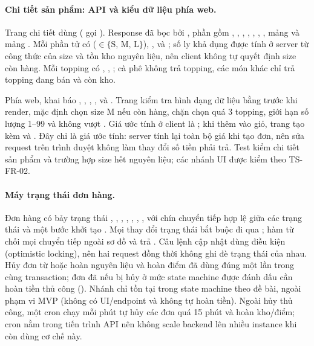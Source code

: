 \paragraph{Chi tiết sản phẩm: API và kiểu dữ liệu phía web.}
Trang chi tiết dùng  ( gọi
). Response đã bọc bởi , phần
 gồm , , , , ,
, , mảng  và mảng . Mỗi phần tử
 có  ($\in \{\text{S, M, L}\}$), ,
 và ; số ly khả dụng được tính ở server từ công thức của
size và tồn kho nguyên liệu, nên client không tự quyết định size còn hàng. Mỗi topping có
, , ; cà phê không trả topping, các món khác chỉ trả topping đang
bán và còn kho.

Phía web,  khai báo ,
, , ,  và
. Trang  kiểm tra hình dạng dữ
liệu bằng  trước khi render, mặc định chọn size M nếu còn hàng, chặn chọn quá
3 topping, giới hạn số lượng 1--99 và không vượt . Giá ước tính ở client là
; khi thêm vào giỏ, trang tạo  kèm
 và . Đây chỉ là giá ước tính: server tính lại toàn bộ giá
khi tạo đơn, nên sửa request trên trình duyệt không làm thay đổi số tiền phải trả. Test
 kiểm chi tiết sản phẩm và trường hợp size hết nguyên liệu; các nhánh UI
được kiểm theo TS-FR-02.

\paragraph{Máy trạng thái đơn hàng.}
Đơn hàng có bảy trạng thái , , ,
, , , , với chín chuyển tiếp hợp lệ
giữa các trạng thái và một bước khởi tạo . Mọi thay đổi trạng
thái bắt buộc đi qua ; hàm  từ chối mọi
chuyển tiếp ngoài sơ đồ và trả . Câu lệnh cập nhật dùng điều kiện
 (optimistic locking), nên hai request
đồng thời không ghi đè trạng thái của nhau. Hủy đơn từ  hoặc
 hoàn nguyên liệu và hoàn điểm đã dùng đúng một lần trong cùng transaction;
đơn đã  nếu bị hủy ở mức state machine được đánh dấu cần hoàn tiền thủ công
(). Nhánh  chỉ tồn tại
trong state machine theo đề bài, ngoài phạm vi MVP (không có UI/endpoint và không tự hoàn tiền).
Ngoài hủy thủ công, một cron chạy mỗi phút tự hủy các đơn  quá 15 phút và hoàn
kho/điểm; cron nằm trong tiến trình API nên không scale backend lên nhiều instance khi còn dùng cơ
chế này.

